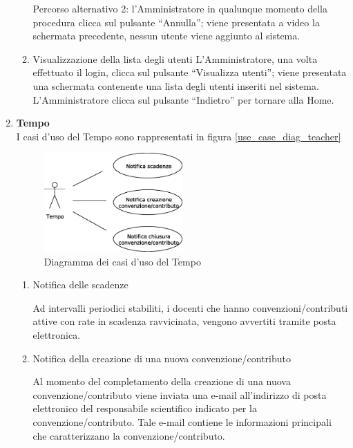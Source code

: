 \begin{enumerate}
\begin{enumerate}
 Percorso alternativo 2:
 l'Amministratore in qualunque momento della procedura clicca sul pulsante ``Annulla''; viene presentata a video la schermata precedente,
 nessun utente viene aggiunto al sistema.
 
 \item Visualizzazione della lista degli utenti \label{UC_view_user_list}
  L'Amministratore, una volta effettuato il login, clicca sul pulsante ``Visualizza utenti''; viene presentata una schermata contenente una lista  degli
  utenti inseriti nel sistema. L'Amministratore clicca sul pulsante ``Indietro'' per tornare alla Home.
\end{enumerate}

\item \textbf{Tempo}\\
I casi d'uso del Tempo sono rappresentati in figura \ref{use_case_diag_teacher}
\begin{figure}[h]
  \caption{Diagramma dei casi d'uso del Tempo}
  \label{use_case_diag_time}
  \centering
\includegraphics[width = 0.5\textwidth]{images/casi_uso_tempo.eps}
\end{figure}
\begin{enumerate}
 \item Notifica delle scadenze\\ \label{UC_notify_deadlines}
 
    Ad intervalli periodici stabiliti, i docenti che hanno convenzioni/contributi attive con rate in scadenza ravvicinata, vengono avvertiti tramite posta elettronica.
  
 
 \item Notifica della creazione di una nuova convenzione/contributo\\ \label{UC_notify_new_contract}
 
    Al momento del completamento della creazione di una nuova convenzione/contributo viene inviata una e-mail all'indirizzo di posta elettronico del responsabile scientifico indicato per la convenzione/contributo. Tale e-mail contiene
    le informazioni principali che caratterizzano la convenzione/contributo.
  

\end{enumerate}
\end{enumerate}

